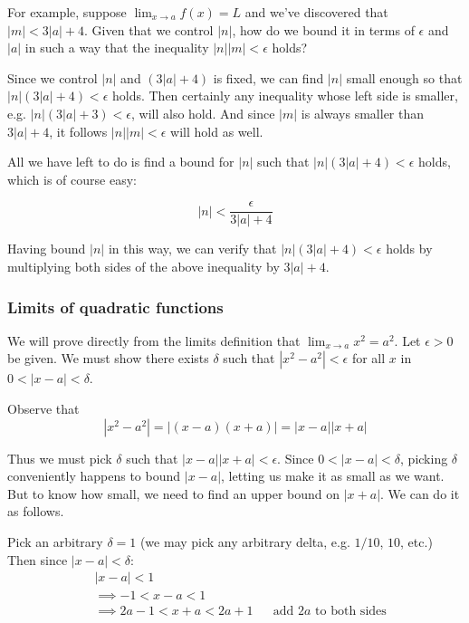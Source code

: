 \vs

For example, suppose $\lim_{x\to a}f(x)=L$ and we've discovered that
$|m|<3|a|+4$. Given that we control $|n|$, how do we bound it in terms
of $\epsilon$ and $|a|$ in such a way that the inequality $|n||m|<\epsilon$ holds?

\vs

Since we control $|n|$ and $(3|a|+4)$ is fixed, we can find $|n|$
small enough so that $|n|(3|a|+4)<\epsilon$ holds. Then certainly any
inequality whose left side is smaller, e.g. $|n|(3|a|+3)<\epsilon$, will also
hold. And since $|m|$ is always smaller than $3|a|+4$, it follows
$|n||m|<\epsilon$ will hold as well.

\vs

All we have left to do is find a bound for $|n|$ such that
$|n|(3|a|+4)<\epsilon$ holds, which is of course easy:

\[|n|<\frac{\epsilon}{3|a|+4}\]

Having bound $|n|$ in this way, we can verify that
$|n|(3|a|+4)<\epsilon$ holds by multiplying both sides of the above
inequality by $3|a|+4$.

\subsubsection*{Limits of quadratic functions}

We will prove directly from the limits definition that
$\lim_{x\to a}x^2=a^2$. Let $\epsilon>0$ be given. We must show there exists
$\delta$ such that $|x^2-a^2|<\epsilon$ for all $x$ in $0<|x-a|<\delta$.

\vs

Observe that
\[|x^2-a^2|=|(x-a)(x+a)|=|x-a||x+a|\]

Thus we must pick $\delta$ such that $|x-a||x+a|<\epsilon$. Since
$0<|x-a|<\delta$, picking $\delta$ conveniently happens to bound
$|x-a|$, letting us make it as small as we want. But to know how
small, we need to find an upper bound on $|x+a|$. We can do it as
follows.

\vs

Pick an arbitrary $\delta=1$ (we may pick any arbitrary delta, e.g. $1/10$,
$10$, etc.) Then since $|x-a|<\delta$:
\begin{align*}
    &|x-a|<1\\
    &\implies -1<x-a<1\\
    &\implies 2a-1<x+a<2a+1&&\text{add $2a$ to both sides}
\end{align*}


